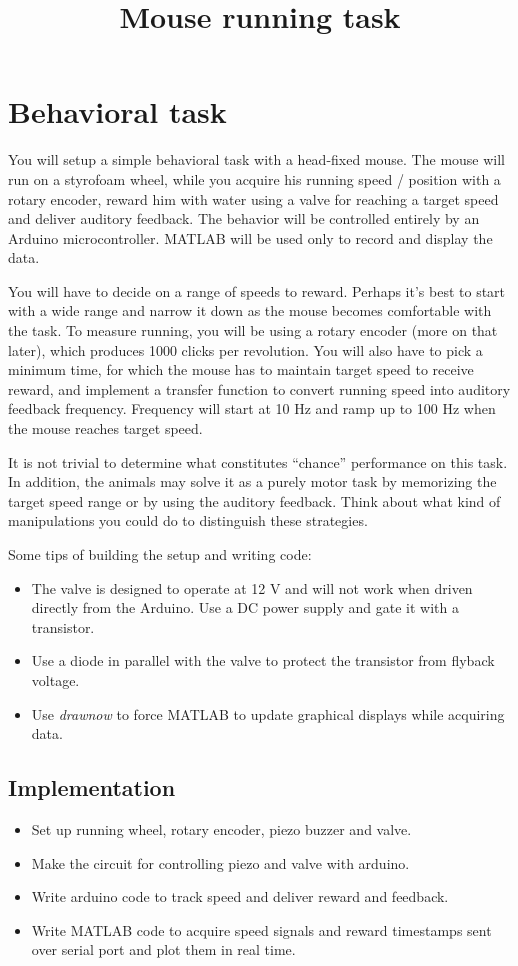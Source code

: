 \documentclass[a4paper,10pt]{article}
\title{Mouse running task}
\author{}
\date{}
\begin{document}
\maketitle
\section{Behavioral task}
You will setup a simple behavioral task with a head-fixed mouse. The mouse will run on a styrofoam wheel, 
while you acquire his running speed / position with a rotary encoder, reward him with water using a valve for 
reaching a target speed and deliver auditory feedback. The behavior will be controlled entirely
by an Arduino microcontroller. MATLAB will be used only to record and display the data.

You will have to decide on a range of speeds to reward. Perhaps it's best to start with a wide range
and narrow it down as the mouse becomes comfortable with the task. To measure running, you will be using a rotary encoder
 (more on that later), which produces 1000 clicks per revolution. You will also 
 have to pick a minimum time, for which the mouse has to maintain target speed to receive reward, 
and implement a transfer function to convert running speed into auditory feedback frequency. 
Frequency will start at 10 Hz and ramp up to 100 Hz when the mouse reaches target speed.

It is not trivial to determine what constitutes ``chance'' performance on this task. In addition, the animals
may solve it as a purely motor task by memorizing the target speed range or by using the auditory feedback.
Think about what kind of manipulations you could do to distinguish these strategies.

Some tips of building the setup and writing code:
\begin{itemize}
 \item The valve is designed to operate at 12 V and will not work when driven directly from the Arduino. 
 Use a DC power supply and gate it with a transistor.
 \item Use a diode in parallel with the valve to protect the transistor from flyback voltage.
 \item Use \textit{drawnow} to force MATLAB to update graphical displays while acquiring data.
\end{itemize}

\subsection{Implementation}
\begin{itemize}
 \item Set up running wheel, rotary encoder, piezo buzzer and valve.
 \item Make the circuit for controlling piezo and valve with arduino.
 \item Write arduino code to track speed and deliver reward and feedback.
 \item Write MATLAB code to acquire speed signals and reward timestamps sent over serial port
 and plot them in real time.
\end{itemize}
\end{document}
